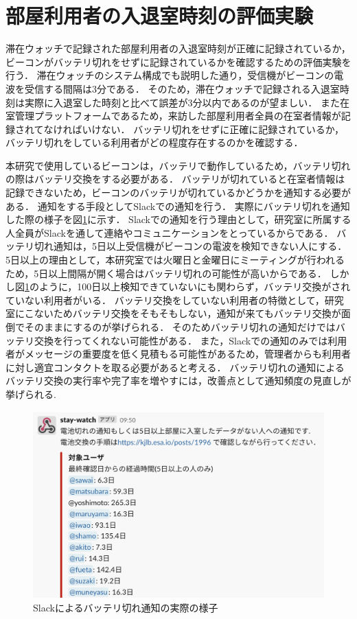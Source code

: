 



\section{部屋利用者の入退室時刻の評価実験}\label{3.3}
滞在ウォッチで記録された部屋利用者の入退室時刻が正確に記録されているか，ビーコンがバッテリ切れをせずに記録されているかを確認するための評価実験を行う．
滞在ウォッチのシステム構成でも説明した通り，受信機がビーコンの電波を受信する間隔は3分である．
そのため，滞在ウォッチで記録される入退室時刻は実際に入退室した時刻と比べて誤差が3分以内であるのが望ましい．
また在室管理プラットフォームであるため，来訪した部屋利用者全員の在室者情報が記録されてなければいけない．
バッテリ切れをせずに正確に記録されているか，バッテリ切れをしている利用者がどの程度存在するのかを確認する．

本研究で使用しているビーコンは，バッテリで動作しているため，バッテリ切れの際はバッテリ交換をする必要がある．
バッテリが切れていると在室者情報は記録できないため，ビーコンのバッテリが切れているかどうかを通知する必要がある．
通知をする手段としてSlackでの通知を行う．
実際にバッテリ切れを通知した際の様子を図\ref{batoff}に示す．
Slackでの通知を行う理由として，研究室に所属する人全員がSlackを通して連絡やコミュニケーションをとっているからである．
バッテリ切れ通知は，5日以上受信機がビーコンの電波を検知できない人にする．
5日以上の理由として，本研究室では火曜日と金曜日にミーティングが行われるため，5日以上間隔が開く場合はバッテリ切れの可能性が高いからである．
しかし図\ref{batoff}のように，100日以上検知できていないにも関わらず，バッテリ交換がされていない利用者がいる．
バッテリ交換をしていない利用者の特徴として，研究室にこないためバッテリ交換をそもそもしない，通知が来てもバッテリ交換が面倒でそのままにするのが挙げられる．
そのためバッテリ切れの通知だけではバッテリ交換を行ってくれない可能性がある．
また，Slackでの通知のみでは利用者がメッセージの重要度を低く見積もる可能性があるため，管理者からも利用者に対し適宜コンタクトを取る必要があると考える．
バッテリ切れの通知によるバッテリ交換の実行率や完了率を増やすには，改善点として通知頻度の見直しが挙げられる.

\begin{figure}[H]
  \begin{center}
    \includegraphics[width=160mm]{image/batoff.png}
    \caption{Slackによるバッテリ切れ通知の実際の様子}
    \label{batoff}
  \end{center}
\end{figure}

